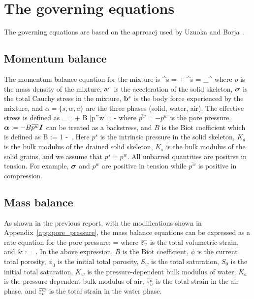\documentclass[11pt,a4paper]{article}
\begin{document}
\clearpage

\section{The  governing equations}
The governing equations are based on the aprroacj used by Uzuoka and Borja~\citep{Uzuoka2012}.  

\subsection{Momentum balance}
The momentum balance equation for the mixture is
\BBeq
  \rho \Ba^s = \Div{\Bsig} + \rho \Bb^s   \quad {} \quad
  \rho = \sum_\alpha \rho^\alpha 
\BEeq
where $\rho$ is the mass density of the mixture, $\mathbf{a}^s$ is the acceleration of the
solid skeleton, $\boldsymbol{\sigma}$ is the total Cauchy stress in the mixture, $\mathbf{b}^s$ is the body 
force experienced by the mixture, and $\alpha = \{s, w, a\}$ are the three phases (solid,
water, air).  The effective stress is defined as
\BBeq
  \Bsig_\Teff = \Bsig + B \bar{p^w} \BI = \Bsig - \Balpha
\BEeq
where $\bar{p^w} = -p^w$ is the pore pressure, $\Balpha := - B \bar{p^w} \BI$ can be treated
as a backstress, and $B$ is the Biot coefficient which is defined as
\BBeq \label{eq:biot}
  B := 1 -  \,.
\BEeq
Here $p^s$ is the intrinsic pressure in the solid skeleton, $K_d$ is the bulk modulus of the drained 
solid skeleton, $K_s$ is the bulk 
modulus of the solid grains, and  we assume that $\bar{p^s} = \bar{p^w}$.  All unbarred 
quantities are positive in tension. For example, $\boldsymbol{\sigma}$ and $p^w$ are positive in tension
while $\bar{p^w}$ is positive in compression.

\subsection{Mass balance}
As shown in the previous report, with the modifications shown in Appendix~\ref{app:pore_pressure},
the mass balance equations can be expressed as a rate equation for the pore pressure:
\BBeq
   =  
\BEeq
where $\bar{\Veps_v}$ is the total volumetric strain, and
\Beq \label{eq:calB}
  \Bal
    \CalB & :=  
           \,.
  \Eal
\Eeq
In the above expression, $B$ is the Biot coefficient, $\phi$ is the current total porosity, 
$\phi_0$ is the initial total porosity, $S_w$ is the total saturation, 
$S_0$ is the initial total saturation, $K_w$ is the pressure-dependent bulk modulus of water, 
$K_a$ is the pressure-dependent bulk modulus of air,  $\bar{\Veps_v^a}$ is the total strain in 
the air phase, and $\bar{\Veps_v^w}$ is the total strain in the water phase.
\end{document}
